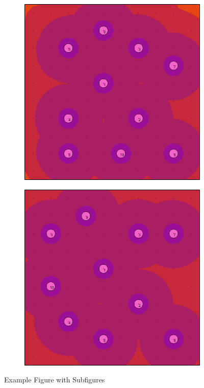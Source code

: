 \documentclass[letterpaper, 10 pt, conference]{ieeeconf}
\begin{document}
\begin{figure}[!h]
\begin{subfigure}[t]{0.3\columnwidth}
    \caption{}
\end{subfigure}%
\hfill
\begin{subfigure}[t]{0.3\columnwidth}
    \centering
    \includegraphics[width=\columnwidth]{Figures/BlankRange400.png}
    \caption{}
\end{subfigure}%
\hfill
\begin{subfigure}[t]{0.3\columnwidth}
    \centering
    \includegraphics[width=\columnwidth]{Figures/BlankRange800.png}
    \caption{}
\end{subfigure}%
\caption{Example Figure with Subfigures}
\end{figure}
\end{document}
